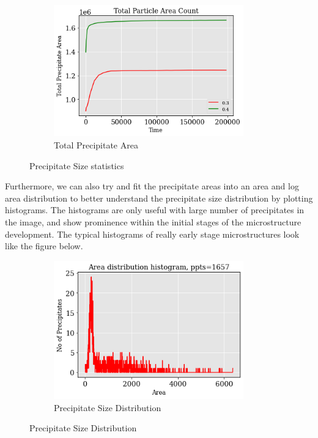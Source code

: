 \documentclass[12pt, a4paper]{report}
\begin{document}
\begin{figure}[H]
\begin{subfigure}{.45\textwidth}
  \centering
  \includegraphics[width=0.9\textwidth]{Pictures/MSFeatures/total_size.png}
  \caption{Total Precipitate Area}
  \label{img:microstrImg}
\end{subfigure}
\caption{Precipitate Size statistics}
\label{fig:test22}
\end{figure}



Furthermore, we can also try and fit the precipitate areas into an area and log area distribution to better understand the precipitate size distribution by plotting histograms. The histograms are only useful with large number of precipitates in the image, and show prominence within the initial stages of the microstructure development. The typical histograms of really early stage microstructures look like the figure below.

\begin{figure}[H]
\centering
\begin{subfigure}{.9\textwidth}
  \centering
  \includegraphics[width=0.9\textwidth]{Pictures/MSFeatures/Area_hist.png}
  \caption{Precipitate Size Distribution}
  \label{img:microstrImg}
\end{subfigure}
\label{fig:test22}
\end{figure}
\end{document}
